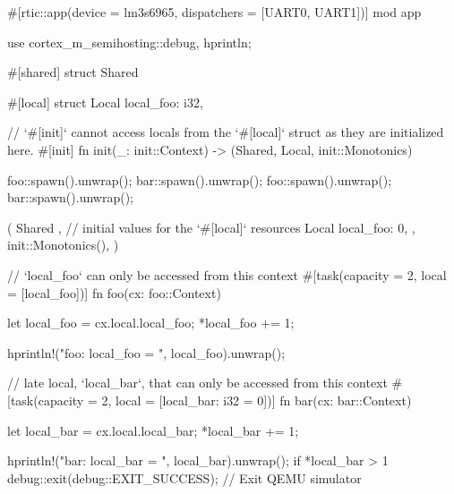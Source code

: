 #[rtic::app(device = lm3s6965, dispatchers = [UART0, UART1])]
mod app {
    use cortex_m_semihosting::{debug, hprintln};

    #[shared]
    struct Shared {}

    #[local]
    struct Local {
        local_foo: i32,
    }

    // `#[init]` cannot access locals from the `#[local]` struct as they are initialized here.
    #[init]
    fn init(_: init::Context) -> (Shared, Local, init::Monotonics) {
        foo::spawn().unwrap();
        bar::spawn().unwrap();
        foo::spawn().unwrap();
        bar::spawn().unwrap();

        (
            Shared {},
            // initial values for the `#[local]` resources
            Local {
                local_foo: 0,
            },
            init::Monotonics(),
        )
    }

    // `local_foo` can only be accessed from this context
    #[task(capacity = 2, local = [local_foo])]
    fn foo(cx: foo::Context) {
        let local_foo = cx.local.local_foo;
        *local_foo += 1;

        hprintln!("foo: local_foo = {}", local_foo).unwrap();
    }

    // late local, `local_bar`, that can only be accessed from this context
    #[task(capacity = 2, local = [local_bar: i32 = 0])]
    fn bar(cx: bar::Context) {
        let local_bar = cx.local.local_bar;
        *local_bar += 1;

        hprintln!("bar: local_bar = {}", local_bar).unwrap();
        if *local_bar > 1{
            debug::exit(debug::EXIT_SUCCESS); // Exit QEMU simulator
        }
    }
}
